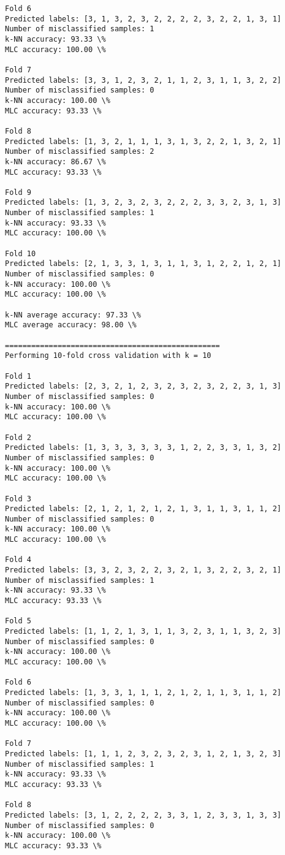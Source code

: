 \documentclass[11pt]{article}
\begin{document}
\begin{Verbatim}[commandchars=\\\{\}]
Fold 6
Predicted labels: [3, 1, 3, 2, 3, 2, 2, 2, 2, 3, 2, 2, 1, 3, 1]
Number of misclassified samples: 1
k-NN accuracy: 93.33 \%
MLC accuracy: 100.00 \%

Fold 7
Predicted labels: [3, 3, 1, 2, 3, 2, 1, 1, 2, 3, 1, 1, 3, 2, 2]
Number of misclassified samples: 0
k-NN accuracy: 100.00 \%
MLC accuracy: 93.33 \%

Fold 8
Predicted labels: [1, 3, 2, 1, 1, 1, 3, 1, 3, 2, 2, 1, 3, 2, 1]
Number of misclassified samples: 2
k-NN accuracy: 86.67 \%
MLC accuracy: 93.33 \%

Fold 9
Predicted labels: [1, 3, 2, 3, 2, 3, 2, 2, 2, 3, 3, 2, 3, 1, 3]
Number of misclassified samples: 1
k-NN accuracy: 93.33 \%
MLC accuracy: 100.00 \%

Fold 10
Predicted labels: [2, 1, 3, 3, 1, 3, 1, 1, 3, 1, 2, 2, 1, 2, 1]
Number of misclassified samples: 0
k-NN accuracy: 100.00 \%
MLC accuracy: 100.00 \%

k-NN average accuracy: 97.33 \%
MLC average accuracy: 98.00 \%

=================================================
Performing 10-fold cross validation with k = 10

Fold 1
Predicted labels: [2, 3, 2, 1, 2, 3, 2, 3, 2, 3, 2, 2, 3, 1, 3]
Number of misclassified samples: 0
k-NN accuracy: 100.00 \%
MLC accuracy: 100.00 \%

Fold 2
Predicted labels: [1, 3, 3, 3, 3, 3, 3, 1, 2, 2, 3, 3, 1, 3, 2]
Number of misclassified samples: 0
k-NN accuracy: 100.00 \%
MLC accuracy: 100.00 \%

Fold 3
Predicted labels: [2, 1, 2, 1, 2, 1, 2, 1, 3, 1, 1, 3, 1, 1, 2]
Number of misclassified samples: 0
k-NN accuracy: 100.00 \%
MLC accuracy: 100.00 \%

Fold 4
Predicted labels: [3, 3, 2, 3, 2, 2, 3, 2, 1, 3, 2, 2, 3, 2, 1]
Number of misclassified samples: 1
k-NN accuracy: 93.33 \%
MLC accuracy: 93.33 \%

Fold 5
Predicted labels: [1, 1, 2, 1, 3, 1, 1, 3, 2, 3, 1, 1, 3, 2, 3]
Number of misclassified samples: 0
k-NN accuracy: 100.00 \%
MLC accuracy: 100.00 \%

Fold 6
Predicted labels: [1, 3, 3, 1, 1, 1, 2, 1, 2, 1, 1, 3, 1, 1, 2]
Number of misclassified samples: 0
k-NN accuracy: 100.00 \%
MLC accuracy: 100.00 \%

Fold 7
Predicted labels: [1, 1, 1, 2, 3, 2, 3, 2, 3, 1, 2, 1, 3, 2, 3]
Number of misclassified samples: 1
k-NN accuracy: 93.33 \%
MLC accuracy: 93.33 \%

Fold 8
Predicted labels: [3, 1, 2, 2, 2, 2, 3, 3, 1, 2, 3, 3, 1, 3, 3]
Number of misclassified samples: 0
k-NN accuracy: 100.00 \%
MLC accuracy: 93.33 \%


\end{Verbatim}
\end{document}
